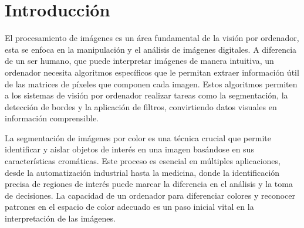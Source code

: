 \documentclass[a4paper,12pt]{article}
\newcommand{\vacio}{\textcolor{white}{ .}}
\begin{document}
{%

\renewcommand{\headrulewidth}{0.5pt}
\fancyhead[L]{\vacio}

\pagestyle{fancy}
\renewcommand{\footrulewidth}{0.5pt}
\fancyfoot[C]{\vacio}

\newpage

\renewcommand{\contentsname}{Índice}
\tableofcontents
{}

\newpage


\section{Introducción}


\vspace{1cm}

El procesamiento de imágenes es un área fundamental de la visión por ordenador, esta se enfoca en la manipulación y el análisis
de imágenes digitales. A diferencia de un ser humano, que puede interpretar imágenes de manera intuitiva, un ordenador necesita
algoritmos específicos que le permitan extraer información útil de las matrices de píxeles que componen cada imagen. Estos 
algoritmos permiten a los sistemas de visión por ordenador realizar tareas como la segmentación, la detección de bordes 
y la aplicación de filtros, convirtiendo datos visuales en información comprensible.

\vspace{0.5cm}

La segmentación de imágenes por color es una técnica crucial que permite identificar y aislar objetos de interés en una imagen 
basándose en sus características cromáticas. Este proceso es esencial en múltiples aplicaciones, desde la automatización 
industrial hasta la medicina, donde la identificación precisa de regiones de interés puede marcar la diferencia en el análisis
y la toma de decisiones. La capacidad de un ordenador para diferenciar colores y reconocer patrones en el espacio de color 
adecuado es un paso inicial vital en la interpretación de las imágenes.

}
\end{document}
